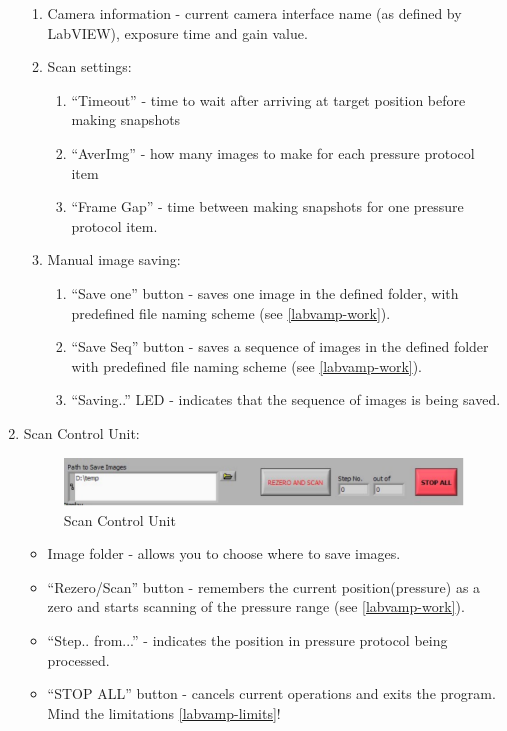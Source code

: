 \documentclass[a4paper,12pt]{article}
\begin{document}
\begin{enumerate}
	\begin{enumerate}
		\item Camera information - current camera interface name (as defined by LabVIEW), exposure time and gain value.
		\item Scan settings:
		\begin{enumerate}
			\item ``Timeout'' - time to wait after arriving at target position before making snapshots
			\item ``AverImg'' - how many images to make for each pressure protocol item
			\item ``Frame Gap'' - time between making snapshots for one pressure protocol item.
		\end{enumerate}
		\item Manual image saving:
		\begin{enumerate}
			\item ``Save one'' button - saves one image in the defined folder, with predefined file naming scheme (see \ref{labvamp-work}).
			\item ``Save Seq'' button - saves a sequence of images in the defined folder with predefined file naming scheme (see \ref{labvamp-work}).
			\item ``Saving..'' LED - indicates that the sequence of images is being saved.
		\end{enumerate} 
	\end{enumerate}
	
	\item Scan Control Unit:
	
	\begin{figure}[htbp]
		\centering
			\includegraphics[width=1.00\textwidth]{figs/labvamp_scan.pdf}
		\caption{Scan Control Unit}
		\label{fig:LabVAMP_scan}
	\end{figure}

	\begin{itemize}
		\item Image folder - allows you to choose where to save images.
		\item ``Rezero/Scan'' button - remembers the current position(pressure) as a zero and starts scanning of the pressure range (see \ref{labvamp-work}).
		\item ``Step.. from...'' - indicates the position in pressure protocol being processed.
		\item ``STOP ALL'' button - cancels current operations and exits the program. Mind the limitations \ref{labvamp-limits}!
	\end{itemize}
\end{enumerate}
\end{document}
